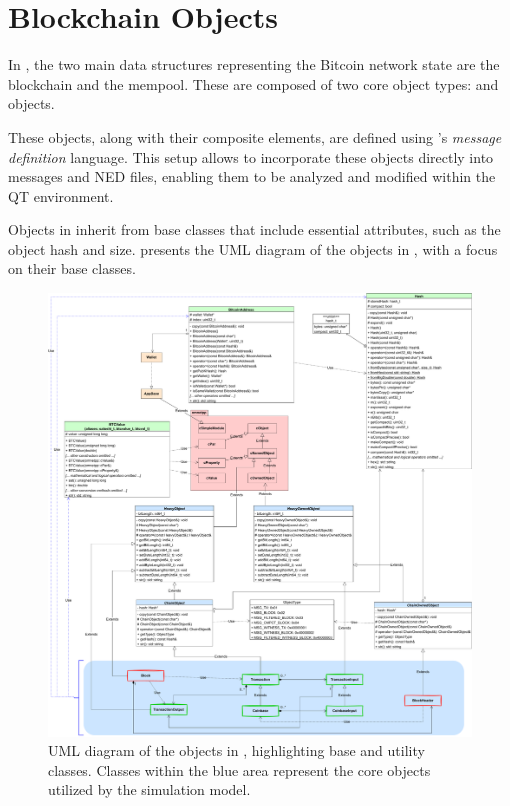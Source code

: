 \section{Blockchain Objects}\label{sec:impl-objects}

In \iblock{}, the two main data structures representing the Bitcoin network
state are the blockchain and the mempool. These are composed of two core object
types:  and  objects.

These objects, along with their composite elements, are defined using
\omnetpp{}'s \emph{message definition} language. This setup allows to
incorporate these objects directly into messages and NED files, enabling them
to be analyzed and modified within the \omnetpp{} QT environment.

Objects in \iblock{} inherit from base classes that include essential
attributes, such as the object hash and size.  presents
the UML diagram of the objects in \iblock{}, with a focus on their base
classes.

\begin{figure}[tbhp]
	\centering
	\includegraphics[width=\textwidth]{img/objects-uml}
	\caption{UML diagram of the objects in \iblock{}, highlighting base and
	utility classes. Classes within the blue area represent the core
	objects utilized by the simulation model.}\label{fig:objects-uml}
\end{figure}

